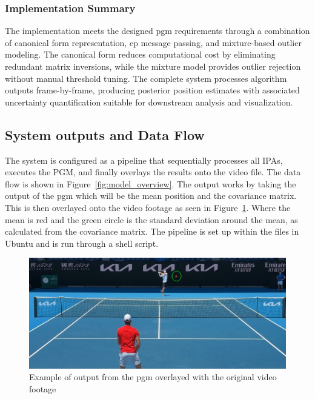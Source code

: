 \documentclass[12pt,a4paper]{article}
\begin{document}
\subsubsection{Implementation Summary}
The implementation meets the designed \acs{pgm} requirements through a combination of canonical form representation, \acs{ep} message passing, and mixture-based outlier modeling. The canonical form reduces computational cost by eliminating redundant matrix inversions, while the mixture model provides outlier rejection without manual threshold tuning. The complete system processes algorithm outputs frame-by-frame, producing posterior position estimates with associated uncertainty quantification suitable for downstream analysis and visualization.


\subsection{System outputs and Data Flow}
The system is configured as a pipeline that sequentially processes all IPAs, executes the PGM, and finally overlays the results onto the video file. The data flow is shown in Figure~\ref{fig:model_overview}. The output works by taking the output of the \acs{pgm} which will be the mean position and the covariance matrix. This is then overlayed onto the video footage as seen in Figure~\ref{fig:output}. Where the mean is red and the green circle is the standard deviation around the mean, as calculated from the covariance matrix. The pipeline is set up within the files in Ubuntu and is run through a shell script.

\begin{figure}[H]
	\centering
	\includegraphics[width=\textwidth]{ZvsDOut.jpg}
	\caption{Example of output from the \acs{pgm} overlayed with the original video footage}
	\label{fig:output}
\end{figure}

\newpage
\end{document}
